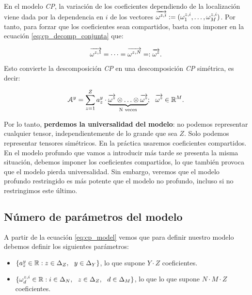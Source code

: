En el modelo \textit{CP}, la variación de los coeficientes dependiendo de la localización viene dada por la dependencia en $i$ de los vectores $\overrightarrow{\omega^{z,i}} := (\omega^{z, i}_1, \ldots, \omega^{z, i}_M)$. Por tanto, para forzar que los coeficientes sean compartidos, basta con imponer en la ecuación \eqref{eq:cp_decomp_conjunta} que:

\begin{equation}
	\overrightarrow{\omega^{z, 1}} = \cdots = \overrightarrow{\omega^{z, N}} =: \overrightarrow{\omega^z}.
\end{equation}

Esto convierte la descomposición \textit{CP} en una descomposición \textit{CP} simétrica, es decir:

\begin{equation}
	\mathcal{A}^y = \sum_{z = 1}^Z a_z^y \cdot \underbrace{\overrightarrow{\omega^z} \otimes \ldots \otimes \overrightarrow{\omega^z}}_\textrm{N veces}; \ \  \overrightarrow{\omega^z} \in \mathbb{R}^M.
\end{equation}

Por lo tanto, \textbf{perdemos la universalidad del modelo}: no podemos representar cualquier tensor, independientemente de lo grande que sea $Z$. Solo podemos representar tensores simétricos. En la práctica usaremos coeficientes compartidos. En el modelo profundo que vamos a introducir más tarde se presenta la misma situación, debemos imponer los coeficientes compartidos, lo que también provoca que el modelo pierda universalidad. Sin embargo, veremos que el modelo profundo restringido es más potente que el modelo no profundo, incluso si no restringimos este último.

\subsection{Número de parámetros del modelo} \label{msubsec:parametros_modelo_cp}

A partir de la ecuación \eqref{eq:cp_model} vemos que para definir nuestro modelo debemos definir los siguientes parámetros:

\begin{itemize}
	\item $\{a_z^y \in \mathbb{R} : z \in \Delta_{Z}, \ \  y \in \Delta_{Y}\}$, lo que supone $Y \cdot Z$ coeficientes.
	\item $\{\omega_d^{z, i} \in \mathbb{R}: i \in \Delta_{N}, \ \  z \in \Delta_{Z}, \ \  d \in \Delta_{M}\}$, lo que lo que supone $N \cdot M \cdot Z$ coeficientes.
\end{itemize}

